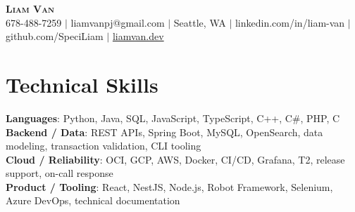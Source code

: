 \documentclass[letterpaper,11pt]{article}
\begin{document}

%
\begin{center}
    \textbf{\Huge \scshape Liam Van} \\ \vspace{1pt}
    \small 678-488-7259 $|$ \small {liamvanpj@gmail.com} $|$ Seattle, WA
 {{$|$ linkedin.com/in/liam-van} {$|$ github.com/SpeciLiam} {$|$ \href{https://liamvan.dev}{liamvan.dev}}}

\end{center}

\section{Technical Skills}
 \begin{itemize}[leftmargin=0.15in, label={}]
    \small{\item{
     \textbf{Languages}{: Python, Java, SQL, JavaScript, TypeScript, C++, C\#, PHP, C} \\
     \textbf{Backend / Data}{: REST APIs, Spring Boot, MySQL, OpenSearch, data modeling, transaction validation, CLI tooling} \\
     \textbf{Cloud / Reliability}{: OCI, GCP, AWS, Docker, CI/CD, Grafana, T2, release support, on-call response} \\
     \textbf{Product / Tooling}{: React, NestJS, Node.js, Robot Framework, Selenium, Azure DevOps, technical documentation} \\
    }}
 \end{itemize}
%

\end{document}

